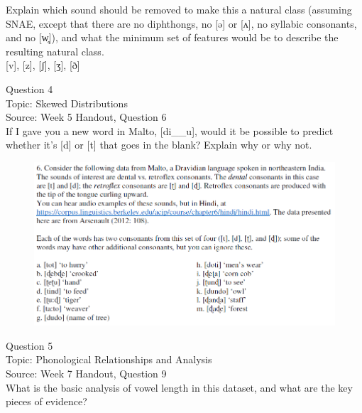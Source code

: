 \documentclass[12pt]{article}
\begin{document}
Explain which sound should be removed to make this a natural class (assuming SNAE, except that there are no diphthongs, no [ə] or [ʌ], no syllabic consonants, and no [w̥]), and what the minimum set of features would be to describe the resulting natural class.\\

{[v]}, {[z]}, {[ʃ]}, {[ʒ]}, {[ð]}


\newpage

{\large Question 4}\\

Topic: Skewed Distributions\\
Source: Week 5 Handout, Question 6\\

If I gave you a new word in Malto, [di\_\_u], would it be possible to predict whether it's [d] or [t] that goes in the blank? Explain why or why not.\\

\begin{figure}[H]
\includegraphics{../images/malto.png}
\end{figure}

\newpage

{\large Question 5}\\

Topic: Phonological Relationships and Analysis\\
Source: Week 7 Handout, Question 9\\

What is the basic analysis of vowel length in this dataset, and what are the key pieces of evidence?\\
\end{document}
